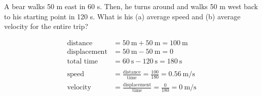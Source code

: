 \documentclass[10pt]{exam}
\begin{document}
\begin{questions}
\begin{multicols}{2}

    \end{multicols}

  \question
    A bear walks 50 m east in 60 s.  Then, he turns around and walks 50 m west back to his starting point in 120 s.  What is his (a) average speed and (b) average velocity for the entire trip?

    \begin{solution}
      \begin{multicols}{2}

        \begin{align*}
          \text{distance} &= 50~\text{m} + 50~\text{m} = 100~\text{m} \\
          \text{displacement} &= 50~\text{m} - 50~\text{m} = 0 \\
          \text{total time} &= 60~\text{s} - 120~\text{s} = 180~\text{s} \\ 
          \\
          \text {speed} &= \frac{\text{distance}}{\text{time}} = \frac{100}{180} = 0.56~\text{m/s} \\
          \text {velocity} &= \frac{\text{displacement}}{\text{time}} = \frac{0}{180} = 0~\text{m/s}
        \end{align*}



\end{multicols}
\end{solution}
\end{questions}
\end{document}
